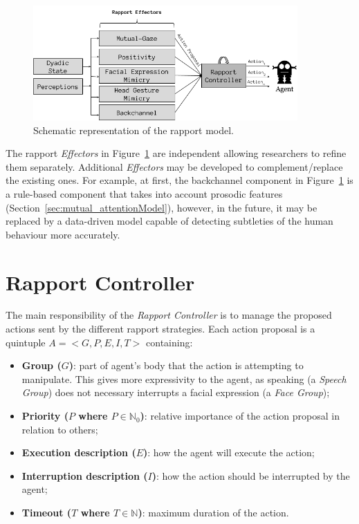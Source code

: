 \begin{figure}[H]
    \centering
    \includegraphics[width=0.9\textwidth]{images/RapportModel.png}
    \caption{Schematic representation of the rapport model.}
    \label{fig:rapportModel}
\end{figure}

The rapport \textit{Effectors} in Figure~\ref{fig:rapportModel} are independent allowing researchers to refine them separately. Additional \textit{Effectors} may be developed to complement/replace the existing ones. For example, at first, the backchannel component in Figure~\ref{fig:rapportModel} is a rule-based component that takes into account prosodic features (Section~\ref{sec:mutual_attentionModel}), however, in the future, it may be replaced by a data-driven model capable of detecting subtleties of the human behaviour more accurately.

\section{Rapport Controller}
\label{sec:rapportController}

The main responsibility of the \textit{Rapport Controller} is to manage the proposed actions sent by the different rapport strategies. Each action proposal is a quintuple $A= <G,P,E,I,T>$ containing:

\begin{itemize}
    \item \textbf{Group ($G$)}: part of agent's body that the action is attempting to manipulate. This gives more expressivity to the agent, as speaking (a \textit{Speech Group}) does not necessary interrupts a facial expression (a \textit{Face Group});
    \item \textbf{Priority ($P$ where $P \in \mathbb{N}_0$)}: relative importance of the action proposal in relation to others; 
    \item \textbf{Execution description ($E$)}: how the agent will execute the action;
    \item \textbf{Interruption description ($I$)}: how the action should be interrupted by the agent;
    \item \textbf{Timeout ($T$ where $T \in \mathbb{N}$)}: maximum duration of the action.
\end{itemize}

